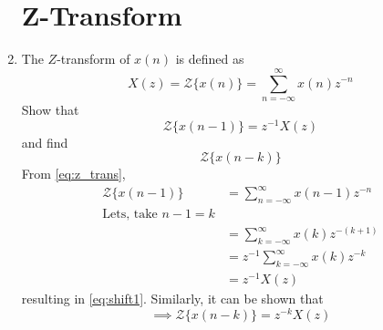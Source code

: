 \documentclass[journal,12pt,twocolumn]{IEEEtran}
\theoremstyle{remark}
\begin{document}
\begin{enumerate}[label=\thesection.\arabic*,ref=\thesection.\theenumi]
\section{Z-Transform}

\item The $Z$-transform of $x(n)$ is defined as
%
\begin{equation}
\label{eq:z_trans}
X(z)={\mathcal {Z}}\{x(n)\}=\sum _{n=-\infty }^{\infty }x(n)z^{-n}
\end{equation}
%
Show that
\begin{equation}
\label{eq:shift1}
{\mathcal {Z}}\{x(n-1)\} = z^{-1}X(z)
\end{equation}
and find
\begin{equation}
	{\mathcal {Z}}\{x(n-k)\} 
\end{equation}
\solution From \eqref{eq:z_trans},
\begin{align}
{\mathcal {Z}}\{x(n-1)\} &=\sum _{n=-\infty }^{\infty }x(n-1)z^{-n}
\\
\text{Lets,  take $n-1=k$}\\
&=\sum _{k=-\infty }^{\infty }x(k)z^{-(k+1)} \\&= z^{-1}\sum _{k=-\infty }^{\infty }x(k)z^{-k}\\
&=z^{-1}X(z)
\end{align}
resulting in \eqref{eq:shift1}. Similarly, it can be shown that
%
\begin{equation}
\label{eq:z_trans_shift}
	\implies {\mathcal {Z}}\{x(n-k)\} = z^{-k}X(z)
\end{equation}


\end{enumerate}
\end{document}
